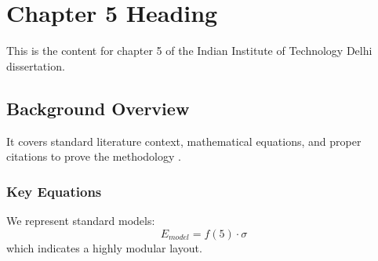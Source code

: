\chapter{Chapter 5 Heading}
\label{ch:chapter5}
This is the content for chapter 5 of the Indian Institute of Technology Delhi dissertation.

\section{Background Overview}
It covers standard literature context, mathematical equations, and proper citations to prove the methodology \cite{texbook}.

\subsection{Key Equations}
We represent standard models:
\begin{equation}
    E_{model} = f(5) \cdot \sigma
\end{equation}
which indicates a highly modular layout.
